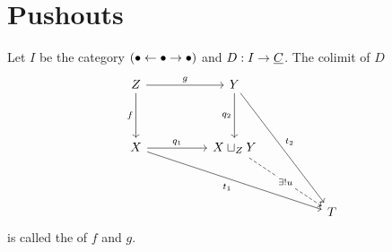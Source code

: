 \section{Pushouts}

Let \( I \) be the category \( (\bullet \leftarrow \bullet \to \bullet) \) and \( D: I \to \underline{C} \). The colimit of \( D \)
\[
	\begin{tikzcd}
		Z && Y \\
		\\
		X && {X \sqcup_Z Y} \\
		\\
		&&&& T
		\arrow["g", from=1-1, to=1-3]
		\arrow["f"', from=1-1, to=3-1]
		\arrow["{q_2}"', from=1-3, to=3-3]
		\arrow["{t_2}", from=1-3, to=5-5]
		\arrow["{q_1}", from=3-1, to=3-3]
		\arrow["{t_1}"', from=3-1, to=5-5]
		\arrow["{\exists!u}"{description}, dashed, from=3-3, to=5-5]
	\end{tikzcd}
\]
is called the  of \( f \) and \( g \).

